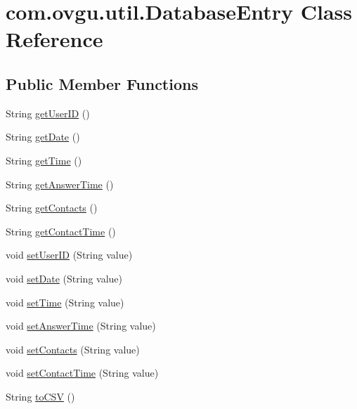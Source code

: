 \hypertarget{classcom_1_1ovgu_1_1util_1_1_database_entry}{\section{com.\-ovgu.\-util.\-Database\-Entry Class Reference}
\label{classcom_1_1ovgu_1_1util_1_1_database_entry}
}
\subsection*{Public Member Functions}
\begin{DoxyCompactItemize}
\item 
String \hyperlink{classcom_1_1ovgu_1_1util_1_1_database_entry_a53818c1011103fee08f1696039efa4b5}{get\-User\-I\-D} ()
\item 
String \hyperlink{classcom_1_1ovgu_1_1util_1_1_database_entry_ab4b670bb0adde9caea76e38c73febb0e}{get\-Date} ()
\item 
String \hyperlink{classcom_1_1ovgu_1_1util_1_1_database_entry_af7f3837d6de3ee67b7f3489340191a6c}{get\-Time} ()
\item 
String \hyperlink{classcom_1_1ovgu_1_1util_1_1_database_entry_a51863be14ac2cc7a494310b54e3da0df}{get\-Answer\-Time} ()
\item 
String \hyperlink{classcom_1_1ovgu_1_1util_1_1_database_entry_a3af262f3003fb93db15e3f752784e2de}{get\-Contacts} ()
\item 
String \hyperlink{classcom_1_1ovgu_1_1util_1_1_database_entry_ad286e4cde28731cab8012622f3cebb4f}{get\-Contact\-Time} ()
\item 
void \hyperlink{classcom_1_1ovgu_1_1util_1_1_database_entry_a023633441e5765e247eaee998e6f62a8}{set\-User\-I\-D} (String value)
\item 
void \hyperlink{classcom_1_1ovgu_1_1util_1_1_database_entry_a316eee6a35971dd7f8bb09a2e64964d7}{set\-Date} (String value)
\item 
void \hyperlink{classcom_1_1ovgu_1_1util_1_1_database_entry_a7fd9b1ec15f6381d240e9709edf0ee42}{set\-Time} (String value)
\item 
void \hyperlink{classcom_1_1ovgu_1_1util_1_1_database_entry_aafadffefd6154e5611c19990a2706ced}{set\-Answer\-Time} (String value)
\item 
void \hyperlink{classcom_1_1ovgu_1_1util_1_1_database_entry_aa603a98fdddc90e4a2150a19143a1dd3}{set\-Contacts} (String value)
\item 
void \hyperlink{classcom_1_1ovgu_1_1util_1_1_database_entry_a6e44d812319dd9c7a8dd30302f412283}{set\-Contact\-Time} (String value)
\item 
String \hyperlink{classcom_1_1ovgu_1_1util_1_1_database_entry_a12e0a8032913a9f99c44f5f287783396}{to\-C\-S\-V} ()
\end{DoxyCompactItemize}

